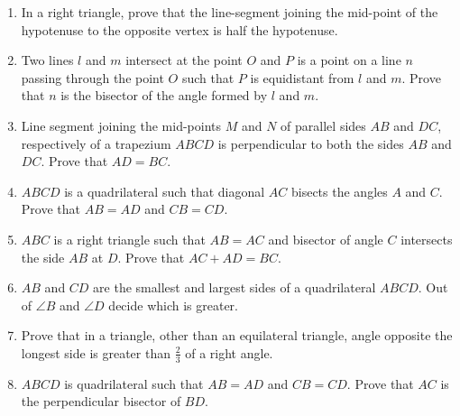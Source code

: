 \documentclass {article}
\begin{document}
\begin {enumerate}
$\angle ABC$ is a right angle.
\item In a right triangle, prove that the line-segment joining the mid-point of the hypotenuse to the opposite vertex is half the hypotenuse.
\item Two lines $l$ and $m$ intersect at the point $O$ and $P$ is a point on a line $n$ passing through the point $O$ such that $P$ is equidistant from $l$ and $m$. Prove that $n$ is the bisector of the angle formed by $l$ and $m$.
\item Line segment joining the mid-points $M$ and $N$ of parallel sides $AB$ and $DC$, respectively of a trapezium $ABCD$ is perpendicular to both the sides $AB$ and $DC$. Prove that $AD = BC$.
\item $ABCD$ is a quadrilateral such that diagonal $AC$ bisects the angles $A$ and $C$. Prove that $AB = AD$ and $CB = CD$.
\item $ABC$ is a right triangle such that $AB = AC$ and bisector of angle $C$ intersects the side $AB$ at $D$. Prove that $AC + AD = BC$.
\item $AB$ and $CD$ are the smallest and largest sides of a quadrilateral $ABCD$. Out of $\angle B$ and $\angle D$ decide which is greater.
\item Prove that in a triangle, other than an equilateral triangle, angle opposite the longest side is greater than $\frac{2}{3}$ of a right angle.
\item $ABCD$ is quadrilateral such that $AB = AD$ and $CB = CD$. Prove that $AC$ is the perpendicular bisector of $BD$.



\end{enumerate}
\end{document}
